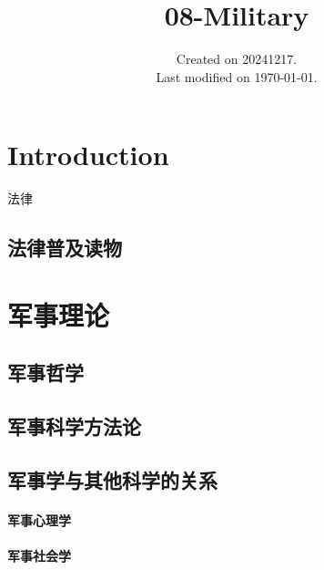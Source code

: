 \documentclass[UTF8]{../ApplicationUniverse}
\begin{document}
\title{08-Military}
\date{Created on 20241217.\\   Last modified on \today.}
\maketitle
\tableofcontents


\chapter{Introduction}
法律

\section{法律普及读物}







\chapter{军事理论}

\section{军事哲学}
\section{军事科学方法论}
\section{军事学与其他科学的关系}
    \subsubsection{军事心理学}
    \subsubsection{军事社会学}
\end{document}
